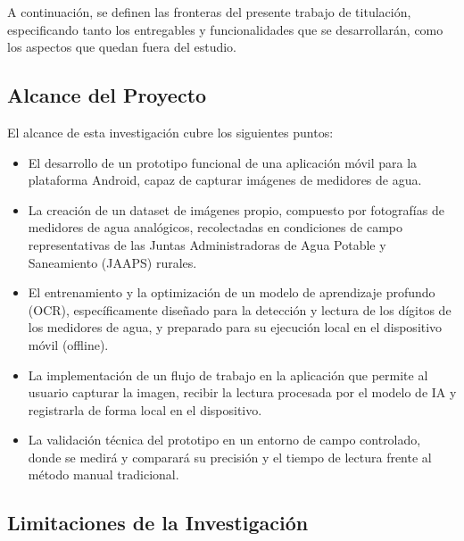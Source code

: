 A continuación, se definen las fronteras del presente trabajo de titulación, especificando tanto los entregables y funcionalidades que se desarrollarán, como los aspectos que quedan fuera del estudio.

\subsection{Alcance del Proyecto}
\label{ssec:scope}

El alcance de esta investigación cubre los siguientes puntos:
\begin{itemize}
\item El desarrollo de un prototipo funcional de una aplicación móvil para la plataforma Android, capaz de capturar imágenes de medidores de agua.
\item La creación de un dataset de imágenes propio, compuesto por fotografías de medidores de agua analógicos, recolectadas en condiciones de campo representativas de las Juntas Administradoras de Agua Potable y Saneamiento (JAAPS) rurales.
\item El entrenamiento y la optimización de un modelo de aprendizaje profundo (OCR), específicamente diseñado para la detección y lectura de los dígitos de los medidores de agua, y preparado para su ejecución local en el dispositivo móvil (offline).
\item La implementación de un flujo de trabajo en la aplicación que permite al usuario capturar la imagen, recibir la lectura procesada por el modelo de IA y registrarla de forma local en el dispositivo.
\item La validación técnica del prototipo en un entorno de campo controlado, donde se medirá y comparará su precisión y el tiempo de lectura frente al método manual tradicional.
\end{itemize}

\subsection{Limitaciones de la Investigación}
\label{ssec:limitations}

